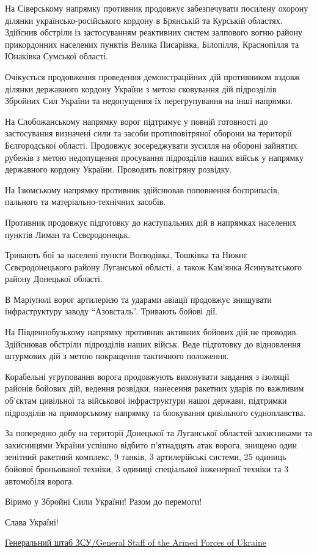На Сіверському напрямку противник продовжує забезпечувати посилену охорону
ділянки українсько-російського кордону в Брянській та Курській областях.
Здійснив обстріли із застосуванням реактивних систем залпового вогню району
прикордонних населених пунктів Велика Писарівка, Білопілля, Краснопілля та
Юнаківка Сумської області.

Очікується продовження проведення демонстраційних дій противником вздовж
ділянки державного кордону України з метою сковування дій підрозділів Збройних
Сил України та недопущення їх перегрупування на інші напрямки.

На Слобожанському напрямку ворог підтримує у повній готовності до застосування
визначені сили та засоби протиповітряної оборони на території Бєлгородської
області. Продовжує зосереджувати зусилля на обороні зайнятих рубежів з метою
недопущення просування підрозділів наших військ у напрямку державного кордону
України. Проводить повітряну розвідку.

На Ізюмському напрямку противник здійснював поповнення боєприпасів, пального та
матеріально-технічних засобів.

Противник продовжує підготовку до наступальних дій в напрямках населених
пунктів Лиман та Сєвєродонецьк. 

Тривають бої за населені пункти Воєводівка, Тошківка та Нижнє Сєвєродонецького
району Луганської області, а також Кам'янка Ясинуватського району Донецької
області.

В Маріуполі ворог артилерією та ударами авіації продовжує знищувати
інфраструктуру заводу \enquote{Азовсталь}. Тривають бойові дії.

На Південнобузькому напрямку противник активних бойових дій не проводив.
Здійснював обстріли підрозділів наших військ. Веде підготовку до відновлення
штурмових дій з метою покращення тактичного положення. 

Корабельні угруповання ворога продовжують виконувати завдання з ізоляції
районів бойових дій, ведення розвідки, нанесення ракетних ударів по важливим
об’єктам цивільної та військової інфраструктури нашої держави, підтримки
підрозділів на приморському напрямку та блокування цивільного судноплавства.

За попередню добу на території Донецької та Луганської областей захисниками та
захисницями України успішно відбито п'ятнадцять атак ворога, знищено один
зенітний ракетний комплекс, 9 танків, 3 артилерійські системи, 25 одиниць
бойової броньованої техніки, 3 одиниці спеціальної інженерної техніки та 3
автомобіля ворога.

Віримо у Збройні Сили України! Разом до перемоги! 

Слава Україні!

\href{https://www.facebook.com/GeneralStaff.ua}{Генеральний штаб ЗСУ/General Staff of the Armed Forces of Ukraine}

